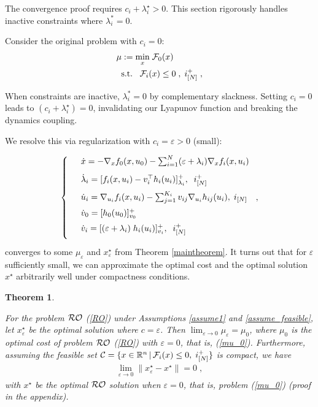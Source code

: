 \documentclass[journal,twoside,web]{ieeecolor}
\newtheorem{theorem}{Theorem}
\begin{document}
The convergence proof requires $c_i+\lambda_i^\star>0$. This section rigorously handles inactive constraints where $\lambda_i^* = 0$.

Consider the original problem with $c_i=0$:
\begin{align} \label{mu_0}
&\mu:=\underset{x}{\min} \; {\cal F}_0(x)\\
&\;\;\text{s.t.}\;\;\;{\cal F}_i(x)\leq 0\;,\;i^+_{[N]}\;,\nonumber
\end{align}

When constraints are inactive, $\lambda_i^* = 0$ by complementary slackness. Setting $c_i = 0$ leads to $(c_i+\lambda_i^\star)=0$, invalidating our Lyapunov function and breaking the dynamics coupling.

We resolve this via regularization with $c_i=\varepsilon>0$ (small):

\begin{align} \label{pd_dynamics_ep}
\left\{
\begin{array}{cl}
\vspace{3mm}
&\dot x=-\nabla_x f_0(x,u_0)- \sum_{i=1}^N(\varepsilon+\lambda_i) \nabla_x f_i(x,u_i)\\
\vspace{2mm}
&\dot \lambda_i=[f_i(x,u_i)-v_i^\top h_i(u_i)]_{\lambda_i}^+,\;\; i^+_{[N]}\\
\vspace{2mm}
&\dot u_i=\nabla_{u_i}f_i(x,u_i)-  \sum_{j=1}^{K_i} v_{ij} \nabla_{u_i} h_{ij}(u_i),\; i_{[N]}\\
\vspace{2mm}
&\dot{v}_0=[h_0(u_0)]_{v_0}^+\\
\vspace{2mm}
&\dot v_i=[(\varepsilon+\lambda_i) \; h_i(u_i)]_{v_i}^+,\;\;i^+_{[N]}
\end{array}\right.,
\end{align}
converges to some $\mu_{\varepsilon}$ and $x^\star_{\varepsilon}$ from Theorem \ref{maintheorem}. It turns out that for $\varepsilon$ sufficiently small, we can approximate the optimal cost and the optimal solution $x^\star$ arbitrarily well under compactness conditions.

\begin{theorem} \label{RO_ROperturbed}

For the problem ${\cal RO}$ (\ref{RO}) under Assumptions \ref{assume1} and \ref{assume_feasible}, let $x^\star_\varepsilon$ be the optimal solution where $c=\varepsilon$. Then
$\displaystyle\lim_{\varepsilon \to 0}\mu_\varepsilon=\mu_0$, where $\mu_0$ is the optimal cost of problem ${\cal RO}$ (\ref{RO}) with $\varepsilon=0$, that is, (\ref{mu_0}). Furthermore, assuming the feasible set ${\cal C}=\{x\in \mathbb{R}^n\,|\,{\cal F}_i(x)\leq 0,\; i^+_{[N]}\}$ is compact, we have
\begin{align*}
\displaystyle\lim_{\varepsilon \to 0} \parallel x_\varepsilon^\star-x^\star \parallel=0\;,
\end{align*}
with $x^\star$ be the optimal ${\cal RO}$ solution when $\varepsilon=0$, that is, problem (\ref{mu_0}) (proof in the appendix).
\end{theorem}
\end{document}
